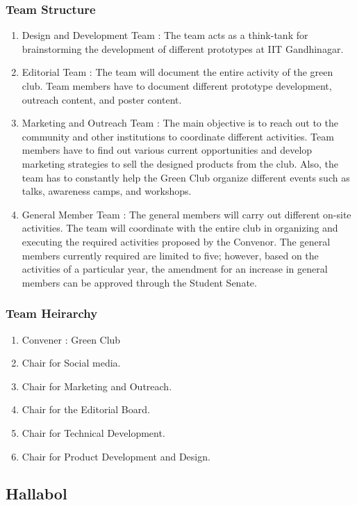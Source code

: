 \documentclass[12pt]{article}
\begin{document}
\subsubsection{Team Structure}
\begin{enumerate}
    \item Design and Development Team : The team acts as a think-tank for brainstorming the development of different prototypes at IIT Gandhinagar.
    \item Editorial Team : The team will document the entire activity of the green club. Team members have to document different prototype development, outreach content, and poster content.
    \item Marketing and Outreach Team : The main objective is to reach out to the community and other institutions to coordinate different activities. Team members have to find out various current opportunities and develop marketing strategies to sell the designed products from the club. Also, the team has to constantly help the Green Club organize different events such as talks, awareness camps, and workshops.
    \item General Member Team : The general members will carry out different on-site activities. The team will coordinate with the entire club in organizing and executing the required activities proposed by the Convenor. The general members currently required are limited to five; however, based on the activities of a particular year, the amendment for an increase in general members can be approved through the Student Senate.
\end{enumerate}
\subsubsection{Team Heirarchy}
\begin{enumerate}
    \item Convener : Green Club
    \item Chair for Social media.
    \item Chair for Marketing and Outreach.
    \item Chair for the Editorial Board.
    \item Chair for Technical Development.
    \item Chair for Product Development and Design.
\end{enumerate}

\subsection{Hallabol}
\end{document}
